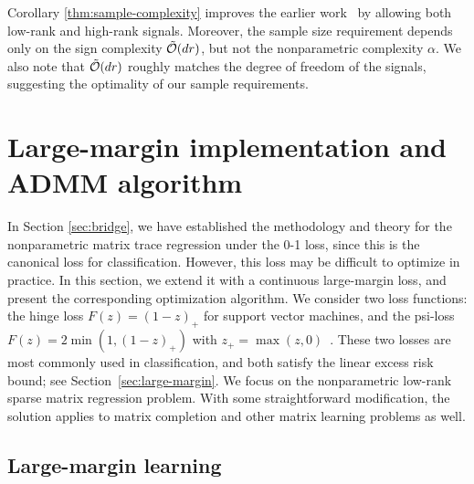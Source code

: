 \documentclass[aos]{imsart}
\theoremstyle{definition}
\begin{document}
\noindent
Corollary \ref{thm:sample-complexity} improves the earlier work~\cite{yuan2016tensor, pmlr-v119-lee20i} by allowing both low-rank and high-rank signals. Moreover, the sample size requirement depends only on the sign complexity $\tilde {\mathcal{O}}(dr)$, but not the nonparametric complexity $\alpha$. We also note that $\tilde {\mathcal{O}}(dr)$ roughly matches the degree of freedom of the signals, suggesting the optimality of our sample requirements.





\section{Large-margin implementation and ADMM algorithm}
\label{sec:estimation}

In Section \ref{sec:bridge}, we have established the methodology and theory for the nonparametric matrix trace regression under the 0-1 loss, since this is the canonical loss for classification. However, this loss may be difficult to optimize in practice. In this section, we extend it with a continuous large-margin loss, and present the corresponding optimization algorithm. We consider two loss functions: the hinge loss $F(z) = (1-z)_+$ for support vector machines, and the psi-loss $F(z)=2\min(1,(1-z)_+)$ with $z_{+}=\max(z,0)$~\cite{shen2003psi}. These two losses are most commonly used in classification, and both satisfy the linear excess risk bound; see Section~\ref{sec:large-margin}. We focus on the nonparametric low-rank sparse matrix regression problem. With some straightforward modification, the solution applies to matrix completion and other matrix learning problems as well. 



\subsection{Large-margin learning} 
\end{document}
